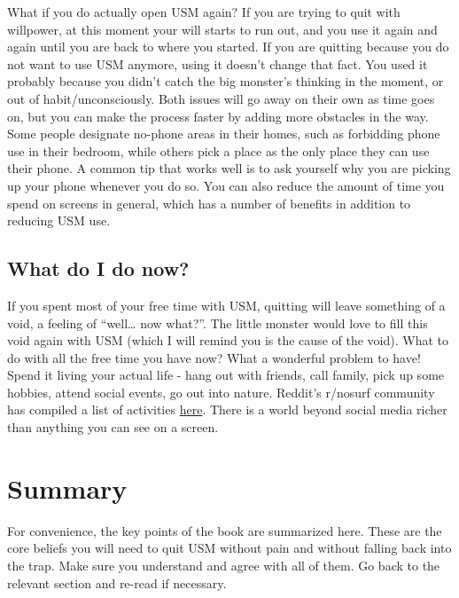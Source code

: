 \documentclass[
  openany]{book}
\begin{document}
What if you do actually open USM again? If you are trying to quit with willpower, at this moment your will starts to run out, and you use it again and again until you are back to where you started. If you are quitting because you do not want to use USM anymore, using it doesn't change that fact. You used it probably because you didn't catch the big monster's thinking in the moment, or out of habit/unconsciously. Both issues will go away on their own as time goes on, but you can make the process faster by adding more obstacles in the way. Some people designate no-phone areas in their homes, such as forbidding phone use in their bedroom, while others pick a place as the only place they can use their phone. A common tip that works well is to ask yourself why you are picking up your phone whenever you do so. You can also reduce the amount of time you spend on screens in general, which has a number of benefits in addition to reducing USM use.

\section{What do I do now?}\label{what-do-i-do-now}

If you spent most of your free time with USM, quitting will leave something of a void, a feeling of ``well\ldots{} now what?''. The little monster would love to fill this void again with USM (which I will remind you is the cause of the void). What to do with all the free time you have now? What a wonderful problem to have! Spend it living your actual life - hang out with friends, call family, pick up some hobbies, attend social events, go out into nature. Reddit's r/nosurf community has compiled a list of activities \href{https://www.reddit.com/r/nosurf/wiki/activities/}{here}. There is a world beyond social media richer than anything you can see on a screen.

\chapter{Summary}\label{summary}

For convenience, the key points of the book are summarized here. These are the core beliefs you will need to quit USM without pain and without falling back into the trap. Make sure you understand and agree with all of them. Go back to the relevant section and re-read if necessary.
\end{document}
